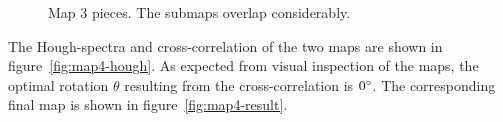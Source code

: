 \begin{figure}[ht]
  \centering
  \caption{Map 3 pieces. The submaps overlap considerably. }
  \label{fig:map4-parts}
\end{figure}

The Hough-spectra and cross-correlation of the two maps are shown in figure~\ref{fig:map4-hough}. As expected from visual inspection of the maps, the optimal rotation $\theta$ resulting from the cross-correlation is $0\degree$. The corresponding final map is shown in figure~\ref{fig:map4-result}.

